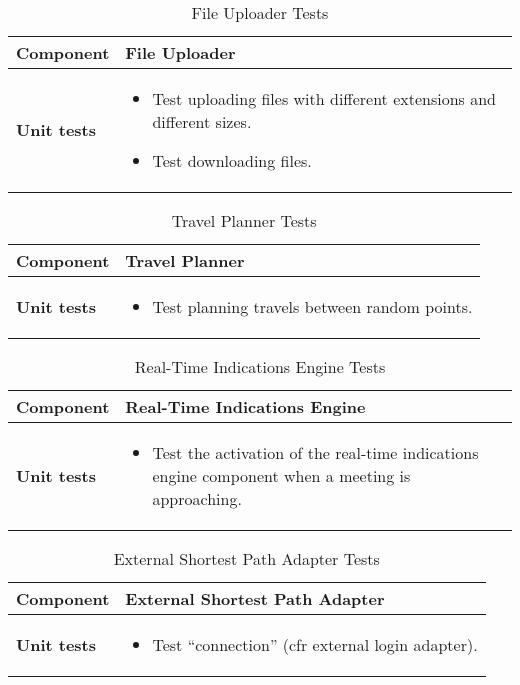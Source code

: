 \begin{table}[H]	
	\centering
	\def\arraystretch{1.5}
	\begin{tabular}{|m{4cm}|m{12cm}|}
		\hline
		\textbf{Component} & File Uploader \\ \hline
		\textbf{Unit tests} & 
			\begin{itemize}
			\item Test uploading files with different extensions and different sizes.
			\item Test downloading files.
			\end{itemize} \\ \hline
	\end{tabular}
	\caption{File Uploader Tests}
\end{table}

\begin{table}[H]	
	\centering
	\def\arraystretch{1.5}
	\begin{tabular}{|m{4cm}|m{12cm}|}
		\hline
		\textbf{Component} & Travel Planner \\ \hline
		\textbf{Unit tests} & 
			\begin{itemize}
			\item Test planning travels between random points.
			\end{itemize} \\ \hline
	\end{tabular}
	\caption{Travel Planner Tests}
\end{table}

\begin{table}[H]	
	\centering
	\def\arraystretch{1.5}
	\begin{tabular}{|m{4cm}|m{12cm}|}
		\hline
		\textbf{Component} & Real-Time Indications Engine \\ \hline
		\textbf{Unit tests} & 
			\begin{itemize}
			\item Test the activation of the real-time indications engine component when a meeting is approaching.
			\end{itemize} \\ \hline
	\end{tabular}
	\caption{Real-Time Indications Engine Tests}
\end{table}

\begin{table}[H]	
	\centering
	\def\arraystretch{1.5}
	\begin{tabular}{|m{4cm}|m{12cm}|}
		\hline
		\textbf{Component} & External Shortest Path Adapter \\ \hline
		\textbf{Unit tests} & 
			\begin{itemize}
			\item Test ``connection'' (cfr external login adapter).
			\end{itemize} \\ \hline
	\end{tabular}
	\caption{External Shortest Path Adapter Tests}
\end{table}


